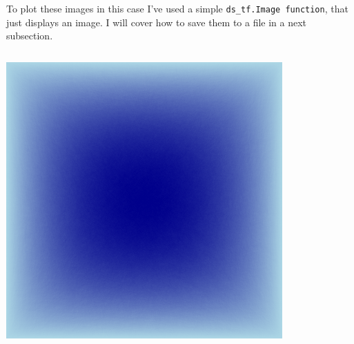 \documentclass[12pt, a4paper]{article}
\begin{document}
\bgroup
  \inputminted[linenos, breaklines=true, fontsize=\scriptsize, firstnumber=last]{python}{src/youtube/datashader/simple/1a_prep.py}
  \label{listing:youtube_lgr_1a}
\egroup

To plot these images in this case I've used a simple \texttt{ds\_tf.Image function}, that just displays an image. I will cover how to save them to a file in a next subsection.

\bgroup
  \inputminted[linenos, breaklines=true, fontsize=\scriptsize, firstnumber=last]{python}{src/youtube/datashader/simple/1b_plot.py}
  \label{listing:youtube_lgr_1b}
\egroup


\begin{multicols}{2}
{\centering
\includegraphics[width=\columnwidth]{src/youtube/datashader/simple/fullgraph_edges}\\
\label{fig:ds_fullgraph_edges}}
{\centering
}
\end{multicols}
\end{document}
